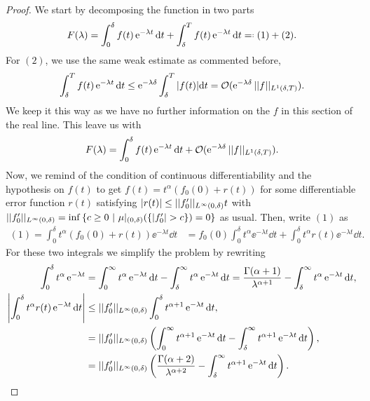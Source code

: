 \begin{proof}
	 We start by decomposing the function in two parts
	\begin{equation}
		F(\lambda) = \int_{0}^{\delta} f(t) \ee^{-\lambda t} \dd t + \int_{\delta}^{T} f(t) \ee^{-\lambda t} \dd t \revdeff (1) + (2).
	\end{equation}
	For $(2)$, we use the same weak estimate as commented before,
	\begin{equation}
		\int_{\delta}^{T} f(t) \ee^{-\lambda t} \dd t \leq  \ee^{-\lambda \delta} \int_{\delta}^{T} |f(t)| \dd t = \Boh(\ee^{-\lambda \delta}  \normL{1}{f}{(\delta, T)}).
	\end{equation}
	We keep it this way as we have no further information on the $f$ in this section of the real line. This leave us with 
	\begin{equation}
		F(\lambda) = \int_{0}^{\delta} f(t) \ee^{-\lambda t} \dd t + \Boh(\ee^{-\lambda \delta}  \normL{1}{f}{(\delta, T)}).		
	\end{equation}
	Now, we remind of the condition of continuous differentiability and the hypothesis on $f(t)$ to get $f(t) = t^\alpha (f_0(0) + r(t))$ for some differentiable error function $r(t)$ satisfying $|r(t)| \leq \normL{\infty}{f_0'}{(0, \delta)} t$ with $\normL{\infty}{f'_0}{(0, \delta)}  = \inf{\{ c \geq 0 \ | \ \mu|_{(0, \delta)}(\{|f'_0| > c\}) = 0 \}}$ as usual. Then, write $(1)$ as
	\begin{align}
		(1) = \int_{0}^{\delta} t^\alpha(f_0(0) + r(t)) \ee^{-\lambda t} \dd t & = f_0(0) \int_{0}^{\delta} t^\alpha \ee^{-\lambda t} \dd t + \int_{0}^{\delta} t^\alpha r(t) \ee^{-\lambda t} \dd t.
	\end{align}
	For these two integrals we simplify the problem by rewriting 
	\begin{align}
	\int_{0}^{\delta} t^\alpha \ee^{-\lambda t} & = \int_{0}^{\infty} t^\alpha \ee^{-\lambda t} \dd t - \int_{\delta}^{\infty} t^\alpha \ee^{-\lambda t} \dd t  = \frac{\Gamma(\alpha + 1)}{\lambda^{\alpha +1}} - \int_{\delta}^{\infty} t^\alpha \ee^{-\lambda t} \dd t, \\
	\left|\int_{0}^{\delta} t^\alpha r(t) \ee^{-\lambda t} \dd t \right| & \leq \normL{\infty}{f_0'}{(0, \delta)} \int_{0}^{\delta} t^{\alpha + 1} \ee^{-\lambda t} \dd t, \\ &=  \normL{\infty}{f_0'}{(0, \delta)} \left( \int_{0}^{\infty} t^{\alpha+1} \ee^{-\lambda t} \dd t - \int_{\delta}^{\infty} t^{\alpha+1} \ee^{-\lambda t} \dd t \right), \\
	& =  \normL{\infty}{f_0'}{(0, \delta)} \left( \frac{\Gamma(\alpha + 2)}{\lambda^{\alpha +2}} - \int_{\delta}^{\infty} t^{\alpha+1} \ee^{-\lambda t} \dd t \right).

\end{align}
\end{proof}

